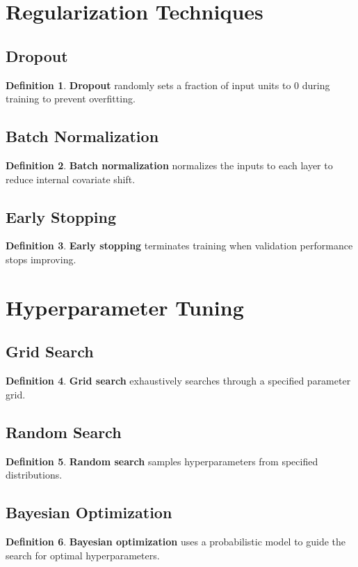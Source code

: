\documentclass[11pt]{article}
\theoremstyle{definition}
\newtheorem{definition}{Definition}[section]
\begin{document}
\section{Regularization Techniques}

\subsection{Dropout}
\begin{definition}
\textbf{Dropout} randomly sets a fraction of input units to 0 during training to prevent overfitting.
\end{definition}

\subsection{Batch Normalization}
\begin{definition}
\textbf{Batch normalization} normalizes the inputs to each layer to reduce internal covariate shift.
\end{definition}

\subsection{Early Stopping}
\begin{definition}
\textbf{Early stopping} terminates training when validation performance stops improving.
\end{definition}

\section{Hyperparameter Tuning}

\subsection{Grid Search}
\begin{definition}
\textbf{Grid search} exhaustively searches through a specified parameter grid.
\end{definition}

\subsection{Random Search}
\begin{definition}
\textbf{Random search} samples hyperparameters from specified distributions.
\end{definition}

\subsection{Bayesian Optimization}
\begin{definition}
\textbf{Bayesian optimization} uses a probabilistic model to guide the search for optimal hyperparameters.
\end{definition}
\end{document}
